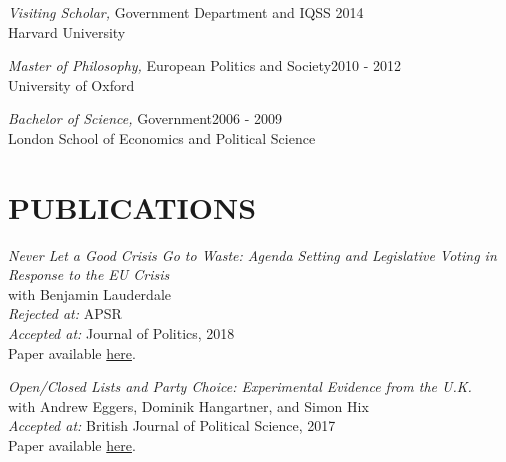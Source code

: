 \documentclass[centered]{res}
\begin{document}
\begin{resume}
		{\sl Visiting Scholar,} Government Department and IQSS \hfill  2014\\
                 Harvard University  

		{\sl Master of Philosophy,} European Politics and Society\hfill 2010 - 2012 \\
                University of Oxford

		{\sl Bachelor of Science,} Government\hfill 2006 - 2009 \\
                London School of Economics and Political Science

\section{PUBLICATIONS} 

{\sl Never Let a Good Crisis Go to Waste: Agenda Setting and Legislative Voting in Response to the EU Crisis} \\with Benjamin Lauderdale\\
\emph{Rejected at:} APSR\\
\emph{Accepted at:} Journal of Politics, 2018\\
Paper available \href{https://www.journals.uchicago.edu/doi/abs/10.1086/694543} {here}.


{\sl Open/Closed Lists and Party Choice: Experimental Evidence from the U.K.}\\with Andrew Eggers, Dominik Hangartner, and Simon Hix \\
\emph{Accepted at:} British Journal of Political Science, 2017\\
Paper available \href{http://journals.cambridge.org/action/displayFulltext?type=1&fid=10345643&jid=JPS&volumeId=-1&issueId=-1&aid=10345638} {here}.


\end{resume}
\end{document}
